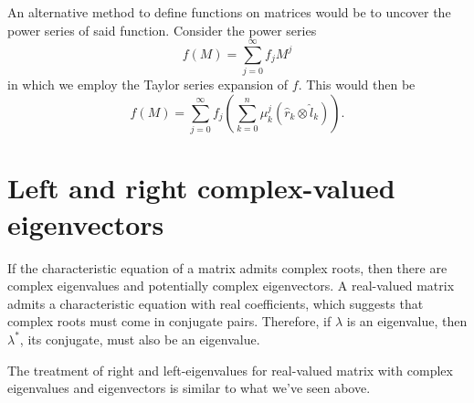 \documentclass[a4paper, 12pt,oneside,openany]{book}
\begin{document}
An alternative method to define functions on matrices would be to uncover the power series of said function. Consider the power series $$f(M)= \sum\limits_{j=0}^\infty f_j M^j$$ in which we employ the Taylor series expansion of $f$. This would then be $$f(M) =\sum\limits_{j=0}^\infty f_j \left(\sum\limits_{k=0}^n \mu_k^j (\hat{r}_k \otimes \hat{l}_k) \right).$$

\section{Left and right complex-valued eigenvectors}

If the characteristic equation of a matrix admits complex roots, then there are complex eigenvalues and potentially complex eigenvectors. A real-valued matrix admits a characteristic equation with real coefficients, which suggests that complex roots must come in conjugate pairs. Therefore, if $\lambda$ is an eigenvalue, then $\lambda^*$, its conjugate, must also be an eigenvalue. 

The treatment of right and left-eigenvalues for real-valued matrix with complex eigenvalues and eigenvectors is similar to what we've seen above.
\end{document}
